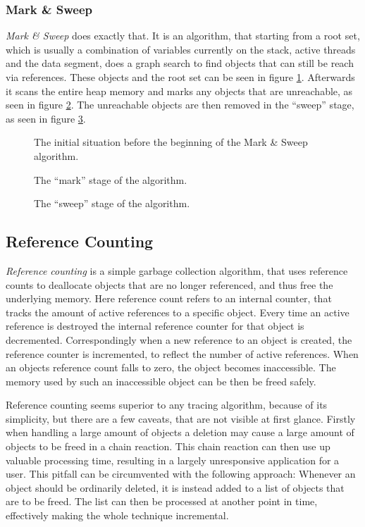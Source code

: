 \documentclass[twocolumn]{article}
\begin{document}
\subsubsection{Mark \& Sweep}
\textit{Mark \& Sweep} does exactly that.
It is an algorithm, that starting from a root set, which is usually a combination of variables currently on the stack, active threads and the data segment, does a graph search to find objects that can still be reach via references. These objects and the root set can be seen in figure \ref{mark-sweep-setup}.
Afterwards it scans the entire heap memory and marks any objects that are unreachable, as seen in figure \ref{mark-sweep-mark}.
The unreachable objects are then removed in the ``sweep'' stage, as seen in figure \ref{mark-sweep-sweep}.
\begin{figure}
    \def\svgwidth{\columnwidth}
    
    \caption{The initial situation before the beginning of the Mark \& Sweep algorithm.}
    \label{mark-sweep-setup}
\end{figure}
\begin{figure}
    \def\svgwidth{\columnwidth}
    
    \caption{The ``mark'' stage of the algorithm.}
    \label{mark-sweep-mark}
\end{figure}
\begin{figure}
    \def\svgwidth{\columnwidth}
    
    \caption{The ``sweep'' stage of the algorithm.}
    \label{mark-sweep-sweep}
\end{figure}
\subsection{Reference Counting}
\label{reference-counting}
\textit{Reference counting} is a simple garbage collection algorithm, that uses reference counts to deallocate objects that are no longer referenced, and thus free the underlying memory.
Here reference count refers to an internal counter, that tracks the amount of active references to a specific object.
Every time an active reference is destroyed the internal reference counter for that object is decremented.
Correspondingly when a new reference to an object is created, the reference counter is incremented, to reflect the number of active references.
When an objects reference count falls to zero, the object becomes inaccessible.
The memory used by such an inaccessible object can be then be freed safely.

Reference counting seems superior to any tracing algorithm, because of its simplicity, but there are a few caveats, that are not visible at first glance.
Firstly when handling a large amount of objects a deletion may cause a large amount of objects to be freed in a chain reaction.
This chain reaction can then use up valuable processing time, resulting in a largely unresponsive application for a user.
This pitfall can be circumvented with the following approach: Whenever an object should be ordinarily deleted, it is instead added to a list of objects that are to be freed.
The list can then be processed at another point in time, effectively making the whole technique incremental.
\end{document}
